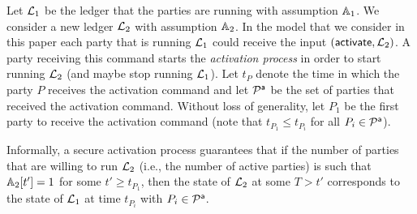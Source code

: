 Let $\mathcal{L}_1$ be the ledger that the parties are running with assumption $\mathbb{A}_1$. We consider a new ledger $\mathcal{L}_2$ with assumption $\mathbb{A}_2$.
In the model that we consider in this paper each party that is running $\mathcal{L}_1$ could receive the input $(\mathsf{activate}, \mathcal{L}_2)$. A party receiving this command starts the \emph{activation process}
in order to start running $\mathcal{L}_2$ (and maybe stop running $\mathcal{L}_1$). Let $t_P$ denote the time in which 
the party $P$ receives the activation command and let $\mathcal{P}^\mathsf{a}$ be the set of parties that received the activation command. Without loss of generality, let $P_1$ be the first party to receive the activation command (note that $t_{P_1}\leq t_{P_i}$ for all $P_i\in\mathcal{P}^\mathsf{a}$).

Informally, a secure activation process guarantees that if the number of parties that are willing to run $\mathcal{L}_2$ (i.e., the number of active parties)  
is such that $\mathbb{A}_2[t']=1$ for some $t'\geq t_{P_1}$, then
the state of $\mathcal{L}_2$ at some $T>t'$ corresponds to the state of $\mathcal{L}_1$ at time $t_{P_i}$ with $P_i\in\mathcal{P}^\mathsf{a}$.

 




